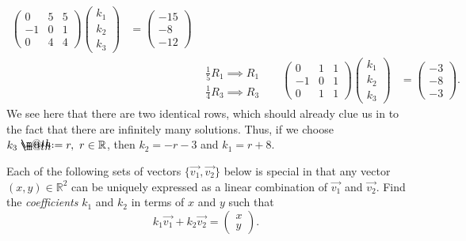 \documentclass{article}
\makeatletter
\newcommand*{\defeq}{\mathrel{\rlap{%
                     \raisebox{0.3ex}{$\m@th\cdot$}}%
                     \raisebox{-0.3ex}{$\m@th\cdot$}}%
                     =}
\makeatother
\begin{document}
\begin{enumerate}
\begin{solution}
\begin{align*}
\begin{pmatrix}
                0&5&5\\-1&0&1\\0&4&4
            \end{pmatrix} \begin{pmatrix}
                k_1\\k_2\\k_3
            \end{pmatrix} &= \begin{pmatrix}
                -15\\-8\\-12
            \end{pmatrix}\\
            &&  \begin{matrix}\\\frac{1}{5}R_1 \implies R_1\\\frac{1}{4}R_3 \implies R_3 \end{matrix}&&\begin{pmatrix}
                0&1&1\\-1&0&1\\0&1&1
            \end{pmatrix} \begin{pmatrix}
                k_1\\k_2\\k_3
            \end{pmatrix} &= \begin{pmatrix}
                -3\\-8\\-3
            \end{pmatrix}.
        \end{align*} We see here that there are two identical rows, which should already clue us in to the fact that there are infinitely many solutions. Thus, if we choose \(k_3 \defeq r,~r\in\mathbb{R}\), then \(k_2=-r-3\) and \(k_1=r+8\).
    \end{solution}
\end{enumerate}
\begin{center}
    \colorbox{CornflowerBlue!50}{
    \begin{minipage}[c]{0.9\textwidth}
        \centering
        Each of the following sets of vectors \(\lbrace\overrightarrow{v_1},\overrightarrow{v_2}\rbrace\) below is special in that any vector \((x,y) \in \mathbb{R}^2 \) can be uniquely 
        expressed as a linear combination of \(\overrightarrow{v_1}\) and \(\overrightarrow{v_2}\). Find the \textit{coefficients} \(k_1\) and \(k_2\) in terms of \(x\) and \(y\) such that\[
            k_1\overrightarrow{v_1} + k_2\overrightarrow{v_2} = \begin{pmatrix}
                x\\y
            \end{pmatrix}.
        \]
    \end{minipage}
    }\end{center}
\end{document}
